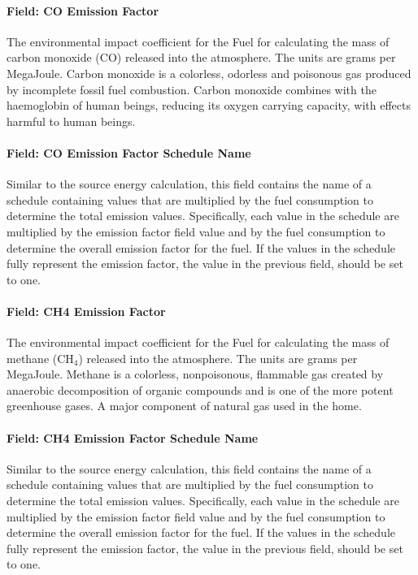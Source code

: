 \paragraph{Field: CO Emission Factor}\label{field-co-emission-factor}

The environmental impact coefficient for the Fuel for calculating the mass of carbon monoxide (CO) released into the atmosphere. The units are grams per MegaJoule. Carbon monoxide is a colorless, odorless and poisonous gas produced by incomplete fossil fuel combustion. Carbon monoxide combines with the haemoglobin of human beings, reducing its oxygen carrying capacity, with effects harmful to human beings.

\paragraph{Field: CO Emission Factor Schedule Name}\label{field-co-emission-factor-schedule-name}

Similar to the source energy calculation, this field contains the name of a schedule containing values that are multiplied by the fuel consumption to determine the total emission values. Specifically, each value in the schedule are multiplied by the emission factor field value and by the fuel consumption to determine the overall emission factor for the fuel. If the values in the schedule fully represent the emission factor, the value in the previous field, should be set to one.

\paragraph{Field: CH4 Emission Factor}\label{field-ch4-emission-factor}

The environmental impact coefficient for the Fuel for calculating the mass of methane (CH\(_{4}\)) released into the atmosphere. The units are grams per MegaJoule. Methane is a colorless, nonpoisonous, flammable gas created by anaerobic decomposition of organic compounds and is one of the more potent greenhouse gases. A major component of natural gas used in the home.

\paragraph{Field: CH4 Emission Factor Schedule Name}\label{field-ch4-emission-factor-schedule-name}

Similar to the source energy calculation, this field contains the name of a schedule containing values that are multiplied by the fuel consumption to determine the total emission values. Specifically, each value in the schedule are multiplied by the emission factor field value and by the fuel consumption to determine the overall emission factor for the fuel. If the values in the schedule fully represent the emission factor, the value in the previous field, should be set to one.

